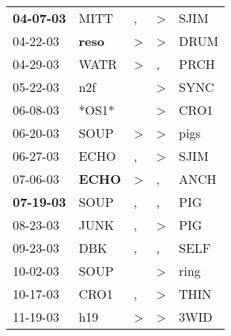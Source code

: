 \begin{supertabular}{p{0.07\textwidth}p{0.06\textwidth}p{0.02\textwidth}p{0.02\textwidth}p{0.06\textwidth}}
 \textbf{04-07-03\textsuperscript{}} &           MITT\textsuperscript{} &             , &     \textgreater &           SJIM\textsuperscript{} \\
          04-22-03\textsuperscript{} &  \textbf{reso\textsuperscript{}} &  \textgreater &     \textgreater &           DRUM\textsuperscript{} \\
          04-29-03\textsuperscript{} &           WATR\textsuperscript{} &  \textgreater &                , &           PRCH\textsuperscript{} \\
          05-22-03\textsuperscript{} &            n2f\textsuperscript{} &               &     \textgreater &           SYNC\textsuperscript{} \\
          06-08-03\textsuperscript{} &                            *OS1* &               &     \textgreater &           CRO1\textsuperscript{} \\
          06-20-03\textsuperscript{} &           SOUP\textsuperscript{} &  \textgreater &     \textgreater &           pigs\textsuperscript{} \\
          06-27-03\textsuperscript{} &           ECHO\textsuperscript{} &             , &     \textgreater &           SJIM\textsuperscript{} \\
          07-06-03\textsuperscript{} &  \textbf{ECHO\textsuperscript{}} &  \textgreater &                , &           ANCH\textsuperscript{} \\
 \textbf{07-19-03\textsuperscript{}} &           SOUP\textsuperscript{} &             , &                , &            PIG\textsuperscript{} \\
          08-23-03\textsuperscript{} &           JUNK\textsuperscript{} &             , &     \textgreater &            PIG\textsuperscript{} \\
          09-23-03\textsuperscript{} &            DBK\textsuperscript{} &             , &                , &           SELF\textsuperscript{} \\
          10-02-03\textsuperscript{} &           SOUP\textsuperscript{} &               &     \textgreater &           ring\textsuperscript{} \\
          10-17-03\textsuperscript{} &           CRO1\textsuperscript{} &             , &     \textgreater &           THIN\textsuperscript{} \\
          11-19-03\textsuperscript{} &            h19\textsuperscript{} &  \textgreater &     \textgreater &           3WID\textsuperscript{} \\

\end{supertabular}
